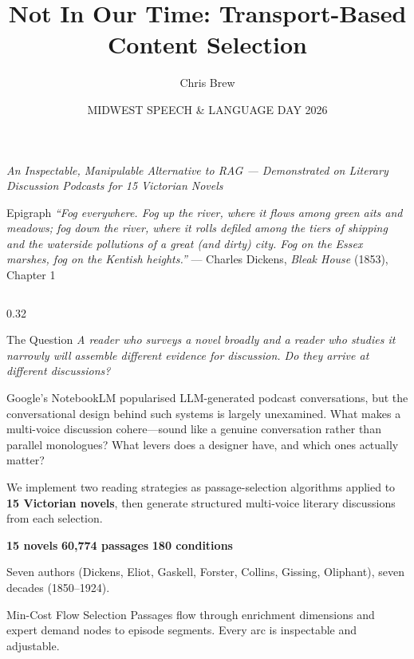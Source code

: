 \documentclass[final]{beamer}
\title{Not In Our Time: Transport-Based Content Selection}
\author{Chris Brew}
\institute{The Ohio State University \and LexisNexis Legal \& Professional}
\date{MIDWEST SPEECH \& LANGUAGE DAY 2026}
\begin{document}
\begin{frame}[t]

\begin{block}{}
    \centering
    {\large \textit{An Inspectable, Manipulable Alternative to RAG --- Demonstrated on Literary Discussion Podcasts for 15 Victorian Novels}}
\end{block}

\begin{block}{Epigraph}
    \textit{``Fog everywhere. Fog up the river, where it flows among green aits and meadows; fog down the river, where it rolls defiled among the tiers of shipping and the waterside pollutions of a great (and dirty) city. Fog on the Essex marshes, fog on the Kentish heights.''} --- Charles Dickens, \textit{Bleak House} (1853), Chapter 1
\end{block}

\begin{columns}[t]

\begin{column}{0.32\textwidth}

\begin{block}{The Question}
    \textit{A reader who surveys a novel broadly and a reader who studies it narrowly will assemble different evidence for discussion. Do they arrive at different discussions?}

    Google's NotebookLM popularised LLM-generated podcast conversations, but the conversational design behind such systems is largely unexamined. What makes a multi-voice discussion cohere---sound like a genuine conversation rather than parallel monologues? What levers does a designer have, and which ones actually matter?

    We implement two reading strategies as passage-selection algorithms applied to \textbf{15 Victorian novels}, then generate structured multi-voice literary discussions from each selection.

    \vspace{10pt}
    \textbf{15 novels} \hfill \textbf{60,774 passages} \hfill \textbf{180 conditions}
    \vspace{5pt}

    Seven authors (Dickens, Eliot, Gaskell, Forster, Collins, Gissing, Oliphant), seven decades (1850--1924).
\end{block}

\begin{block}{Min-Cost Flow Selection}
    Passages flow through enrichment dimensions and expert demand nodes to episode segments. Every arc is inspectable and adjustable.


\end{block}
\end{column}
\end{columns}
\end{frame}
\end{document}
